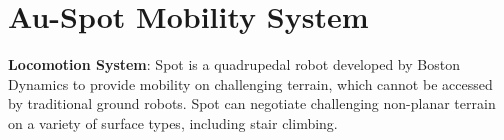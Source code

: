 \documentclass[letterpaper, 10pt, conference]{ieeeconf}      %
\newcommand{\ph}[1]{{\textbf{#1}:}} %
\newcommand{\rev}[1]{{\color{blue} #1 }} %
\begin{document}
\section{Au-Spot Mobility System}\label{sec:spot}
\ph{Locomotion System} 
Spot is a quadrupedal robot developed by Boston Dynamics to provide mobility \rev{on challenging terrain, which cannot be accessed by traditional ground robots.
Spot can negotiate challenging non-planar terrain on a variety of surface types, including stair climbing.}



\end{document}
